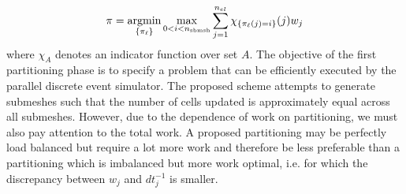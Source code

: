 \begin{equation*}
\pi = \operatorname*{argmin}_{\{\pi_{\ell}\}} \max_{0 < i < n_{\text{sbmsh}}} \sum_{j=1}^{n_{el}} \chi_{\{\pi_{\ell}(j) = i\}}(j) w_{j}
\end{equation*}
where $\chi_A$ denotes an indicator function over set $A$. The objective of the first partitioning phase is to specify a problem that can be efficiently executed by the parallel discrete event simulator. The proposed scheme attempts to generate submeshes such that the number of cells updated is approximately equal across all submeshes. However, due to the dependence of work on partitioning, we must also pay attention to the total work. A proposed partitioning may be perfectly load balanced but require a lot more work and therefore be less preferable than a partitioning which is imbalanced but more work optimal, i.e. for which the discrepancy between $w_j$ and $dt_j^{-1}$ is smaller.

